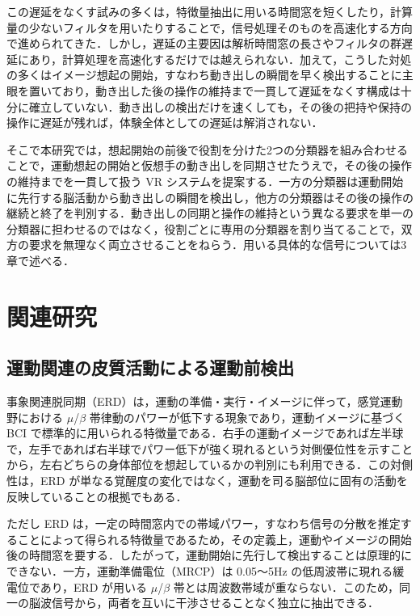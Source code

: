 \documentclass[twoside]{wiss}
\begin{document}
この遅延をなくす試みの多くは，特徴量抽出に用いる時間窓を短くしたり，計算量の少ないフィルタを用いたりすることで，信号処理そのものを高速化する方向で進められてきた．しかし，遅延の主要因は解析時間窓の長さやフィルタの群遅延にあり，計算処理を高速化するだけでは越えられない．加えて，こうした対処の多くはイメージ想起の開始，すなわち動き出しの瞬間を早く検出することに主眼を置いており，動き出した後の操作の維持まで一貫して遅延をなくす構成は十分に確立していない．動き出しの検出だけを速くしても，その後の把持や保持の操作に遅延が残れば，体験全体としての遅延は解消されない．

そこで本研究では，想起開始の前後で役割を分けた2つの分類器を組み合わせることで，運動想起の開始と仮想手の動き出しを同期させたうえで，その後の操作の維持までを一貫して扱う VR システムを提案する．一方の分類器は運動開始に先行する脳活動から動き出しの瞬間を検出し，他方の分類器はその後の操作の継続と終了を判別する．動き出しの同期と操作の維持という異なる要求を単一の分類器に担わせるのではなく，役割ごとに専用の分類器を割り当てることで，双方の要求を無理なく両立させることをねらう．用いる具体的な信号については3章で述べる．

\section{関連研究}

\subsection{運動関連の皮質活動による運動前検出}

事象関連脱同期（ERD）は，運動の準備・実行・イメージに伴って，感覚運動野における $\mu$/$\beta$ 帯律動のパワーが低下する現象であり，運動イメージに基づく BCI で標準的に用いられる特徴量である．右手の運動イメージであれば左半球で，左手であれば右半球でパワー低下が強く現れるという対側優位性を示すことから，左右どちらの身体部位を想起しているかの判別にも利用できる．この対側性は，ERD が単なる覚醒度の変化ではなく，運動を司る脳部位に固有の活動を反映していることの根拠でもある．

ただし ERD は，一定の時間窓内での帯域パワー，すなわち信号の分散を推定することによって得られる特徴量であるため，その定義上，運動やイメージの開始後の時間窓を要する．したがって，運動開始に先行して検出することは原理的にできない．一方，運動準備電位（MRCP）は 0.05〜5Hz の低周波帯に現れる緩電位であり，ERD が用いる $\mu$/$\beta$ 帯とは周波数帯域が重ならない．このため，同一の脳波信号から，両者を互いに干渉させることなく独立に抽出できる．
\end{document}
